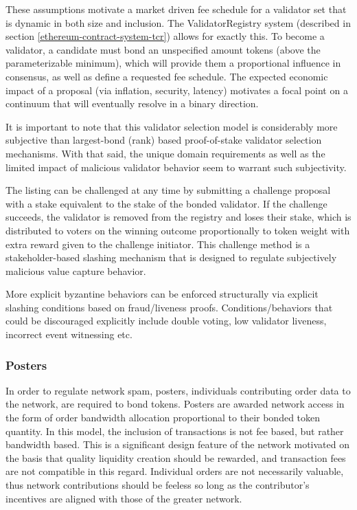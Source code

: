 \documentclass[10pt]{article}
\begin{document}
These assumptions motivate a market driven fee schedule for a validator set that is dynamic in both size and inclusion. The ValidatorRegistry system (described in section \ref{ethereum-contract-system-tcr}) allows for exactly this. To become a validator, a candidate must bond an unspecified amount tokens (above the parameterizable minimum), which will provide them a proportional influence in consensus, as well as define a requested fee schedule. The expected economic impact of a proposal (via inflation, security, latency) motivates a focal point on a continuum that will eventually resolve in a binary direction.
\medskip

It is important to note that this validator selection model is considerably more subjective than largest-bond (rank) based proof-of-stake validator selection mechanisms. With that said, the unique domain requirements as well as the limited impact of malicious validator behavior seem to warrant such subjectivity.
\medskip

The listing can be challenged at any time by submitting a challenge proposal with a stake equivalent to the stake of the bonded validator. If the challenge succeeds, the validator is removed from the registry and loses their stake, which is distributed to voters on the winning outcome proportionally to token weight with extra reward given to the challenge initiator. This challenge method is a stakeholder-based slashing mechanism that is designed to regulate subjectively malicious value capture behavior.
\medskip

More explicit byzantine behaviors can be enforced structurally via explicit slashing conditions based on fraud/liveness proofs. Conditions/behaviors that could be discouraged explicitly include double voting, low validator liveness, incorrect event witnessing etc.

\subsubsection{Posters}\label{incentive-models-posters}
In order to regulate network spam, posters, individuals contributing order data to the network, are required to bond tokens. Posters are awarded network access in the form of order bandwidth allocation proportional to their bonded token quantity. In this model, the inclusion of transactions is not fee based, but rather bandwidth based. This is a significant design feature of the network motivated on the basis that quality liquidity creation should be rewarded, and transaction fees are not compatible in this regard. Individual orders are not necessarily valuable, thus network contributions should be feeless so long as the contributor’s incentives are aligned with those of the greater network.
\medskip
\end{document}
